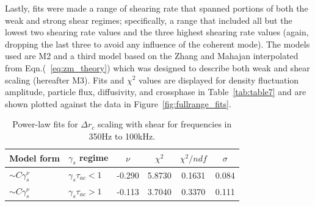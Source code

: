 \documentclass[aip,pop,amsmath,amssymb,peprint,superscriptaddress]{revtex4-1} %
\begin{document}
Lastly, fits were made a range of shearing rate that spanned
portions of both the weak and strong shear regimes; specifically, a
range that included all but the lowest two shearing rate values and
the three highest shearing rate values (again, dropping the last three to avoid any influence of the coherent mode). The models used are M2 and a third model based on the Zhang and Mahajan interpolated from Eqn.(~\ref{eq:zm_theory}) which was designed to describe both weak and shear scaling (hereafter M3). Fits and $\chi^{2}$ values are displayed for density fluctuation amplitude, particle flux, diffusivity, and crossphase in Table~\ref{tab:table7} and are shown plotted against the data in Figure~\ref{fig:fullrange_fits}.

\begin{table}
\caption{\label{tab:table6}Power-law fits for $\Delta r_{c}$ scaling with shear for frequencies in 350Hz to 100kHz.}
\begin{ruledtabular}
\begin{tabular}{llcccc}
Model form&$\gamma_{s}$ regime&$\nu$&$\chi^2$&$\chi^2/ndf$&$\sigma$\\
\hline
$\sim C\gamma_{s}^\nu$&$\gamma_{s}\tau_{ac}<1$ &-0.290 &5.8730 &0.1631 &0.084\\
$\sim C\gamma_{s}^\nu$&$\gamma_{s}\tau_{ac}>1$ &-0.113 &3.7040 &0.3370 &0.111\\
\end{tabular}
\end{ruledtabular}
\end{table}
\end{document}
